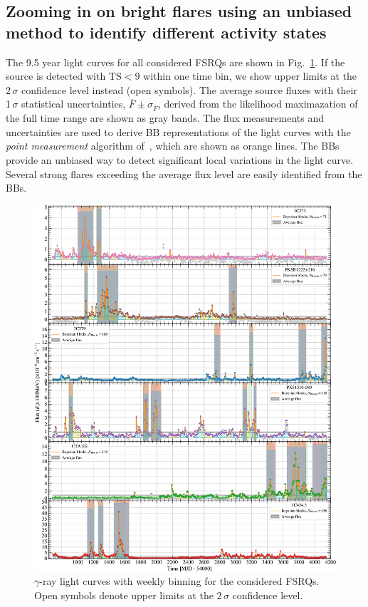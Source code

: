 \documentclass[twocolumn]{aastex62}
\newcommand{\gray}{$\gamma$-ray\xspace}
\begin{document}
\subsection{Zooming in on bright flares using an unbiased method to identify different activity states}
\label{sec:zoom}

The 9.5 year light curves for all considered FSRQs are shown in Fig.~\ref{fig:weekly}. If the source is detected with $\mathrm{TS} < 9$ within one time bin, we show upper limits at the $2\,\sigma$ confidence level instead (open symbols). The average source fluxes with their 1$\,\sigma$ statistical uncertainties, $\overline{F} \pm \sigma_{\overline{F}}$, derived from the likelihood maximazation of the full time range are shown as gray bands. 
The flux measurements and uncertainties are used to derive BB representations of the light curves with the \textit{point measurement} algorithm of~\citet[][]{2013ApJ...764..167S}, which are shown as orange lines. 
The BBs provide an unbiased way to detect significant local variations in the light curve.
Several strong flares exceeding the average flux level are easily identified from the BBs. 

\begin{figure}
    \centering
    \includegraphics[width = .9\linewidth]{figures/lc_weekly_tsmin4.pdf}
    \caption{\gray light curves with weekly binning for the considered FSRQs. Open symbols denote upper limits at the $2\,\sigma$ confidence level.}
    \label{fig:weekly}
\end{figure}
\end{document}
